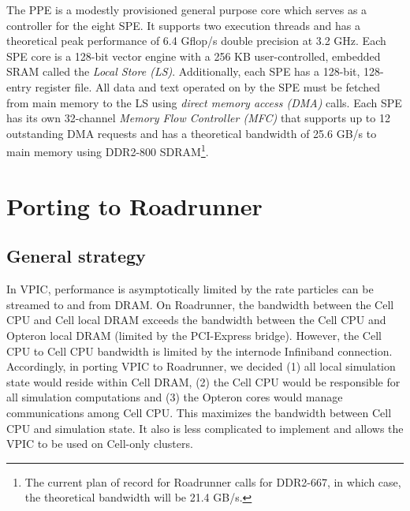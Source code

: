 \documentclass[10pt]{article}
\begin{document}
The PPE is a modestly provisioned general purpose core
which serves as a controller for the eight
SPE.  It supports two execution threads and has a theoretical peak
performance of 6.4 Gflop/s double precision at 3.2 GHz.  Each SPE core
is a 128-bit vector engine with a 256 KB user-controlled, embedded
SRAM called the \emph{Local Store (LS)}.  Additionally, each SPE has a
128-bit, 128-entry register file.  All data and text operated on by
the SPE must be fetched from main memory to the LS using \emph{direct
memory access (DMA)} calls.  Each SPE has its own 32-channel
\emph{Memory Flow Controller (MFC)} that supports up to 12 outstanding
DMA requests and has a theoretical bandwidth of 25.6 GB/s to main
memory using DDR2-800 SDRAM\footnote{The current plan of record for
Roadrunner calls for DDR2-667, in which case, the theoretical
bandwidth will be 21.4 GB/s.}.



\section{Porting to Roadrunner}

\subsection{General strategy}

In VPIC, performance is asymptotically limited by the rate particles
can be streamed to and from DRAM.  On Roadrunner, the bandwidth
between the Cell CPU and Cell local DRAM exceeds the bandwidth between
the Cell CPU and Opteron local DRAM (limited by the PCI-Express
bridge).  However, the Cell CPU to Cell CPU bandwidth is limited by
the internode Infiniband connection.  Accordingly, in porting VPIC to
Roadrunner, we decided (1) all local simulation state would reside
within Cell DRAM, (2) the Cell CPU would be responsible for all
simulation computations and (3) the Opteron cores would manage
communications among Cell CPU.  This maximizes the bandwidth
between Cell CPU and simulation state.  It also is less complicated
to implement and allows the VPIC to be used on Cell-only clusters.
\end{document}
